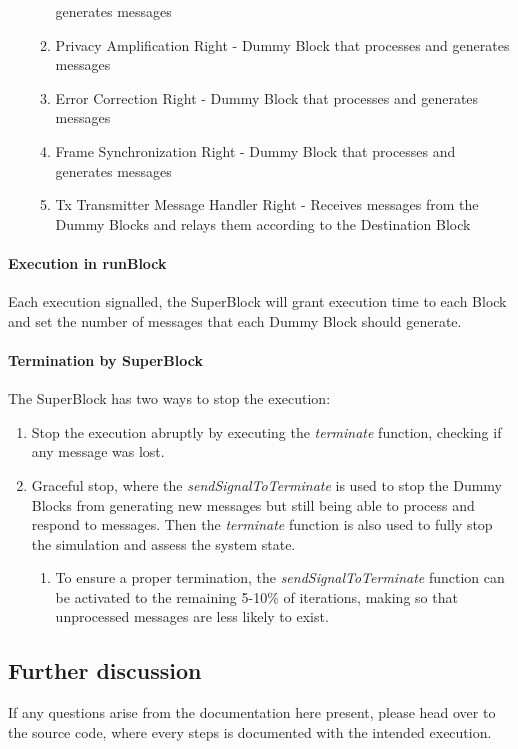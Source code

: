 \begin{refsection}
\begin{enumerate}
\begin{enumerate}
				generates messages
			\item Privacy Amplification Right - Dummy Block that processes and 
				generates messages
			\item Error Correction Right - Dummy Block that processes and 
				generates messages
			\item Frame Synchronization Right - Dummy Block that processes 
				and generates messages
			\item Tx Transmitter Message Handler Right -  Receives messages 
				from the Dummy Blocks and relays them according to the Destination Block
		\end{enumerate}
\end{enumerate}

\paragraph{Execution in runBlock}

Each execution signalled, the SuperBlock will grant execution time to each 
Block and set the number of messages that each Dummy Block should generate. 

\paragraph{Termination by SuperBlock}

The SuperBlock has two ways to stop the execution:
\begin{enumerate}
	\item Stop the execution abruptly by executing the \textit{terminate} function, 
		checking if any message was lost.
	\item Graceful stop, where the \textit{sendSignalToTerminate} is used to stop 
		the Dummy Blocks from generating new messages but still being able to process 
		and respond to messages. Then the \textit{terminate} function is also used to fully 
		stop the simulation and assess the system state.
		\begin{enumerate}
			\item To ensure a proper termination, the \textit{sendSignalToTerminate} 
				function can be activated to the remaining 5-10\% of iterations, 
				making so that unprocessed messages are less likely to exist.
		\end{enumerate}
\end{enumerate}



\subsection{Further discussion}
If any questions arise from the documentation here present, please head over to 
the source code, where every steps is documented with the intended execution.


\end{refsection}
